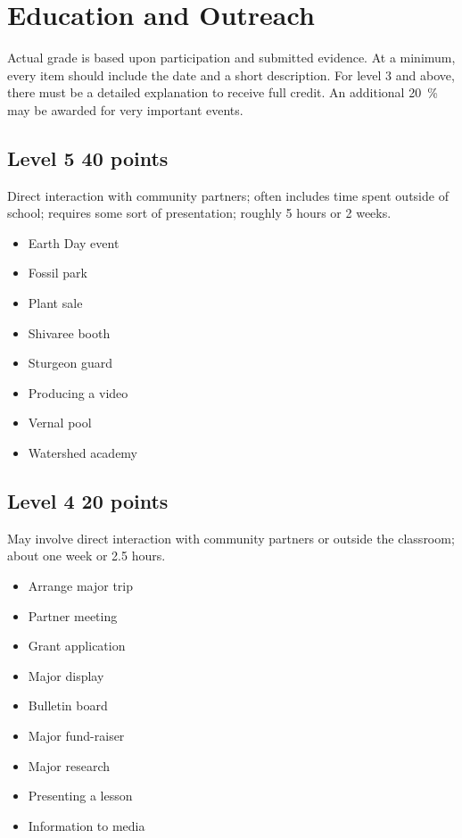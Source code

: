 \documentclass[letterpaper,10pt]{memoir}
\begin{document}
\newpage

{\rightskip 0in
\section*{Education and Outreach}

Actual grade is based upon participation and submitted evidence. At a minimum, every item should include the date and a short description. For level 3 and above, there must be a detailed explanation to receive full credit. An additional \SI{20}{\percent} may be awarded for very important events.

\subsection*{Level 5 \hfill 40 points}

	Direct interaction with community partners; often includes time spent outside of school; requires some sort of presentation; roughly 5 hours or 2 weeks.

	\begin{multicols}{3}\begin{itemize}[label=$-$,itemsep=0mm]
	\item Earth Day event
	\item Fossil park
	\item Plant sale
	\item Shivaree booth
	\item Sturgeon guard
	\item Producing a video
	\item Vernal pool
	\item Watershed academy
	\end{itemize}\end{multicols}

\subsection*{Level 4 \hfill 20 points}

	May involve direct interaction with community partners or outside the classroom; about one week or 2.5 hours.

	\begin{multicols}{3}\begin{itemize}[label=$-$,itemsep=0mm]
	\item Arrange major trip
	\item Partner meeting
	\item Grant application
	\item Major display
	\item Bulletin board
	\item Major fund-raiser
	\item Major research
	\item Presenting a lesson
	\item Information to media
	\end{itemize}\end{multicols}

}
\end{document}
